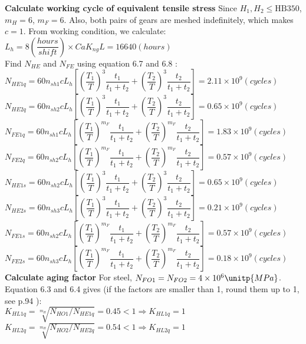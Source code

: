 \textbf{Calculate working cycle of equivalent tensile stress} Since $ H_1,H_2\leq\text{HB}350 $, $ m_H=6 $, $ m_F=6 $. Also, both pairs of gears are meshed indefinitely, which makes $ c=1 $. From working condition, we calculate:\\
$ L_h = 8\unit{\left( \dfrac{hours}{shift}\right)}\times Ca  K_{ng} L=16640\unit{(hours)}$\\
Find $ N_{HE} $ and $ N_{FE} $  using equation 6.7 and 6.8 \cite{tk1}:\\
$ N_{HE1q} = 60n_{sh1}cL_h\left[ \left( \dfrac{T_1}{T}\right)^3\dfrac{t_1}{t_1+t_2} + \left( \dfrac{T_2}{T}\right)^3\dfrac{t_2}{t_1+t_2}\right] = 2.11\times10^9\unit{(cycles)}$\\
$ N_{HE2q} = 60n_{sh2}cL_h\left[ \left( \dfrac{T_1}{T}\right)^3\dfrac{t_1}{t_1+t_2} + \left( \dfrac{T_2}{T}\right)^3\dfrac{t_2}{t_1+t_2}\right] = 0.65\times10^9\unit{(cycles)}$\\
$ N_{FE1q} = 60n_{sh1}cL_h\left[ \left( \dfrac{T_1}{T}\right)^{m_F}\dfrac{t_1}{t_1+t_2} + \left( \dfrac{T_2}{T}\right)^{m_F}\dfrac{t_2}{t_1+t_2}\right] = 1.83\times10^9\unit{(cycles)}$\\
$ N_{FE2q} = 60n_{sh2}cL_h\left[ \left( \dfrac{T_1}{T}\right)^{m_F}\dfrac{t_1}{t_1+t_2} + \left( \dfrac{T_2}{T}\right)^{m_F}\dfrac{t_2}{t_1+t_2}\right] = 0.57\times10^9\unit{(cycles)}$\\
$ N_{HE1s} = 60n_{sh2}cL_h\left[ \left( \dfrac{T_1}{T}\right)^3\dfrac{t_1}{t_1+t_2} + \left( \dfrac{T_2}{T}\right)^3\dfrac{t_2}{t_1+t_2}\right] = 0.65\times10^9\unit{(cycles)}$\\
$ N_{HE2s} = 60n_{sh3}cL_h\left[ \left( \dfrac{T_1}{T}\right)^3\dfrac{t_1}{t_1+t_2} + \left( \dfrac{T_2}{T}\right)^3\dfrac{t_2}{t_1+t_2}\right] = 0.21\times10^9\unit{(cycles)}$\\
$ N_{FE1s} = 60n_{sh2}cL_h\left[ \left( \dfrac{T_1}{T}\right)^{m_F}\dfrac{t_1}{t_1+t_2} + \left( \dfrac{T_2}{T}\right)^{m_F}\dfrac{t_2}{t_1+t_2}\right] = 0.57\times10^9\unit{(cycles)}$\\
$ N_{FE2s} = 60n_{sh3}cL_h\left[ \left( \dfrac{T_1}{T}\right)^{m_F}\dfrac{t_1}{t_1+t_2} + \left( \dfrac{T_2}{T}\right)^{m_F}\dfrac{t_2}{t_1+t_2}\right] = 0.18\times10^9\unit{(cycles)}$\\

\textbf{Calculate aging factor} 
For steel, $ N_{FO1}= N_{FO2}= 4\times10^6\unitp{MPa}$. Equation 6.3 and 6.4 \cite{tk1}  gives (if the factors are smaller than 1, round them up to 1, see p.94 \cite{tk1}):\\
$ K_{HL1q} = \sqrt[m_H]{N_{HO1}/N_{HE1q}} = 0.45 < 1 \Rightarrow K_{HL1q} = 1$\\
$ K_{HL2q} = \sqrt[m_H]{N_{HO2}/N_{HE2q}} = 0.54 < 1 \Rightarrow K_{HL2q} = 1$\\

